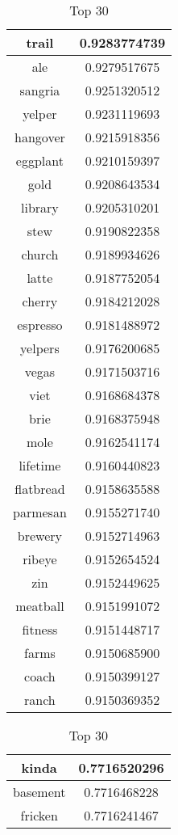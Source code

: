 \documentclass{article}
\begin{document}
\begin{table}[ht]
\parbox{.22\linewidth}{
\centering
\begin{tabular}{|c|c|}
\hline
trail & 0.9283774739 \\
\hline
ale & 0.9279517675 \\
\hline
sangria & 0.9251320512 \\
\hline
yelper & 0.9231119693 \\
\hline
hangover & 0.9215918356 \\
\hline
eggplant & 0.9210159397 \\
\hline
gold & 0.9208643534 \\
\hline
library & 0.9205310201 \\
\hline
stew & 0.9190822358 \\
\hline
church & 0.9189934626 \\
\hline
latte & 0.9187752054 \\
\hline
cherry & 0.9184212028 \\
\hline
espresso & 0.9181488972 \\
\hline
yelpers & 0.9176200685 \\
\hline
vegas & 0.9171503716 \\
\hline
viet & 0.9168684378 \\
\hline
brie & 0.9168375948 \\
\hline
mole & 0.9162541174 \\
\hline
lifetime & 0.9160440823 \\
\hline
flatbread & 0.9158635588 \\
\hline
parmesan & 0.9155271740 \\
\hline
brewery & 0.9152714963 \\
\hline
ribeye & 0.9152654524 \\
\hline
zin & 0.9152449625 \\
\hline
meatball & 0.9151991072 \\
\hline
fitness & 0.9151448717 \\
\hline
farms & 0.9150685900 \\
\hline
coach & 0.9150399127 \\
\hline
ranch & 0.9150369352 \\
\hline
\end{tabular}
\caption{Top 30}
}
\hfill
\parbox{.24\linewidth}{
\centering
\begin{tabular}{|c|c|}
\hline
kinda & 0.7716520296 \\
\hline
basement & 0.7716468228 \\
\hline
fricken & 0.7716241467 \\

\end{tabular}}
\end{table}
\end{document}
